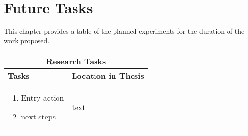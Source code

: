 \chapter{Future Tasks}
This chapter provides a table of the planned experiments for the duration of the work proposed.

\begin{table}[H]
	\caption[List of Research Tasks]{List of research tasks and their corresponding locations in the dissertation document.}
	\label{tab:future_tasks}
	\begin{longtable}{ |p{8cm}|p{6cm}|  } 
		\hline
		\multicolumn{2}{|c|}{\textbf{Research Tasks}} \\
		\hline
		\hline
		\textbf{Tasks} & \textbf{Location in Thesis} \\
		\hline
		\begin{enumerate}
			\item Entry action
			\item next steps
		\end{enumerate} & text\\
		\hline
	\end{longtable}
\end{table}